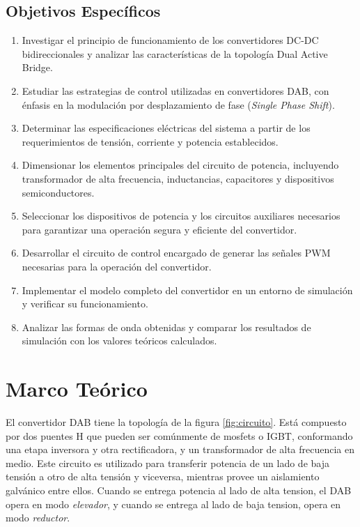 \documentclass[11pt, a4paper]{article}
\begin{document}
\subsection{Objetivos Específicos}

\begin{enumerate}
\item Investigar el principio de funcionamiento de los convertidores DC-DC bidireccionales y analizar las características de la topología Dual Active Bridge.

\item Estudiar las estrategias de control utilizadas en convertidores DAB, con énfasis en la modulación por desplazamiento de fase (\textit{Single Phase Shift}).

\item Determinar las especificaciones eléctricas del sistema a partir de los requerimientos de tensión, corriente y potencia establecidos.

\item Dimensionar los elementos principales del circuito de potencia, incluyendo transformador de alta frecuencia, inductancias, capacitores y dispositivos semiconductores.

\item Seleccionar los dispositivos de potencia y los circuitos auxiliares necesarios para garantizar una operación segura y eficiente del convertidor.

\item Desarrollar el circuito de control encargado de generar las señales PWM necesarias para la operación del convertidor.

\item Implementar el modelo completo del convertidor en un entorno de simulación y verificar su funcionamiento.

\item Analizar las formas de onda obtenidas y comparar los resultados de simulación con los valores teóricos calculados.
\end{enumerate}

\section{Marco Teórico}

El convertidor DAB tiene la topología de la figura \ref{fig:circuito}. Está compuesto por dos puentes H que pueden ser comúnmente de mosfets o IGBT, conformando una etapa inversora y otra rectificadora, y un transformador de alta frecuencia en medio. Este circuito es utilizado para transferir potencia de un lado de baja tensión a otro de alta tensión y viceversa, mientras provee un aislamiento galvánico entre ellos. Cuando se entrega potencia al lado de alta tension, el DAB opera en modo \emph{elevador}, y cuando se entrega al lado de baja tension, opera en modo \emph{reductor}.
\end{document}
